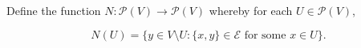 Define the function $N: \mathcal{P}(V) \rightarrow \mathcal{P}(V)$ whereby for each $U \in \mathcal{P}(V)$,

$$N(U) = \{y \in V \setminus U : \{x, y\} \in \mathcal{E} \text{ for some } x \in U\}.$$